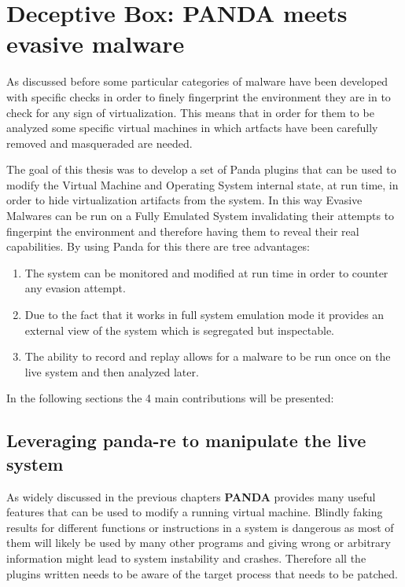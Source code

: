 \chapter{Deceptive Box: PANDA meets evasive malware}
\label{chap:4}

As discussed before some particular categories of malware have been developed with specific checks in order to finely fingerprint the environment they are in to check for any sign of virtualization. This means that in order for them to be analyzed some specific virtual machines in which artfacts have been carefully removed and masqueraded are needed.

The goal of this thesis was to develop a set of Panda plugins that can be used to modify the Virtual Machine and Operating System internal state, at run time, in order to hide virtualization artifacts from the system. In this way Evasive Malwares can be run on a Fully Emulated System invalidating their attempts to fingerpint the environment and therefore having them to reveal their real capabilities.
By using Panda for this there are tree advantages: 
\begin{enumerate}
    \item The system can be monitored and modified at run time in order to counter any evasion attempt. 
    \item Due to the fact that it works in full system emulation mode it provides an external view of the system which is segregated but inspectable.
    \item The ability to record and replay allows for a malware to be run once on the live system and then analyzed later.
\end{enumerate}

In the following sections the 4 main contributions will be presented: 

\section{Leveraging panda-re to manipulate the live system}

As widely discussed in the previous chapters \textbf{PANDA} provides many useful features that can be used to modify a running virtual machine. Blindly faking results for different functions or instructions in a system is dangerous as most of them will likely be used by many other programs and giving wrong or arbitrary information might lead to system instability and crashes. Therefore all the plugins written needs to be aware of the target process that needs to be patched.

